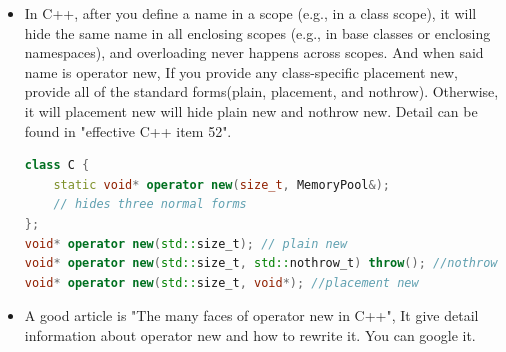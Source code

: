\documentclass[a4paper,11pt,twoside]{book}
\begin{document}
\begin{itemize}
		\item In C++, after you define a name in a scope (e.g., in a class scope), it will hide the same name in all enclosing scopes (e.g., in base classes or enclosing namespaces), and overloading never happens across scopes. And when said name is operator new, If you provide any class-specific placement new, provide all of the standard forms(plain, placement, and nothrow). Otherwise, it will placement new will hide plain new and nothrow new. Detail can be found in "effective C++ item 52".
\begin{lstlisting}[frame=single, language=c++, mathescape=true]
class C {
	static void* operator new(size_t, MemoryPool&);
	// hides three normal forms
};
void* operator new(std::size_t); // plain new
void* operator new(std::size_t, std::nothrow_t) throw(); //nothrow new
void* operator new(std::size_t, void*);	//placement new	
\end{lstlisting}


	\item A good article is "The many faces of operator new in C++", It give  detail information about operator new and how to rewrite it. You can google it.
\end{itemize}
\end{document}
